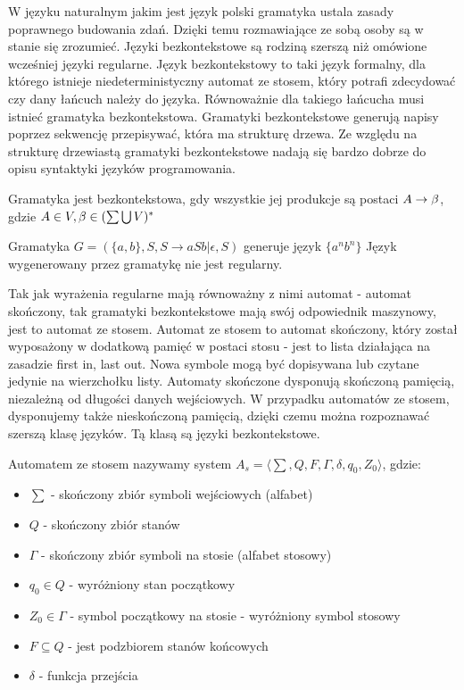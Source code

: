 W języku naturalnym jakim jest język polski gramatyka ustala zasady poprawnego budowania zdań. Dzięki temu rozmawiające ze sobą osoby są w stanie się zrozumieć. Języki bezkontekstowe są rodziną szerszą niż omówione wcześniej języki regularne. Język bezkontekstowy to taki język formalny, dla którego istnieje niedeterministyczny automat ze stosem, który potrafi zdecydować czy dany łańcuch należy do języka. Równoważnie dla takiego łańcucha musi istnieć gramatyka bezkontekstowa. Gramatyki bezkontekstowe generują napisy poprzez sekwencję przepisywać, która ma strukturę drzewa. Ze względu na strukturę drzewiastą gramatyki bezkontekstowe nadają się bardzo dobrze do opisu syntaktyki języków programowania.

\begin{definicja}
Gramatyka jest bezkontekstowa, gdy wszystkie jej produkcje są postaci $\mathnormal{A \rightarrow \beta}$, gdzie $\mathnormal{A \in V, \beta \in (\sum \bigcup V)^{*}}$
\end{definicja}

\begin{przyklad}
	Gramatyka $G = (\{a,b  \}, {S}, {S \rightarrow aSb | \epsilon }, S) $ generuje język $ \{a^{n}b^{n}\}$ Język wygenerowany przez gramatykę nie jest regularny.
\end{przyklad}

Tak jak wyrażenia regularne mają równoważny z nimi automat - automat skończony, tak gramatyki bezkontekstowe mają swój odpowiednik maszynowy, jest to automat ze stosem. Automat ze stosem to automat skończony, który został wyposażony w dodatkową pamięć w postaci stosu - jest to lista działająca na zasadzie first in, last out. Nowa symbole mogą być dopisywana lub czytane jedynie na wierzchołku listy. Automaty skończone dysponują skończoną pamięcią, niezależną od długości danych wejściowych. W przypadku automatów ze stosem, dysponujemy także nieskończoną pamięcią, dzięki czemu można rozpoznawać szerszą klasę języków. Tą klasą są języki bezkontekstowe.

\begin{definicja}
	Automatem ze stosem nazywamy system $A_{s} = \langle \sum, Q, F, \Gamma, \delta, q_{0}, Z_{0} \rangle $, gdzie:
	\begin{itemize}
		\item $\sum$ - skończony zbiór symboli wejściowych (alfabet)
		\item $Q$ - skończony zbiór stanów
		\item $\Gamma$ - skończony zbiór symboli na stosie (alfabet stosowy)
		\item $q_{0} \in Q$ - wyróżniony stan początkowy
		\item $Z_{0} \in \Gamma$ - symbol początkowy na stosie - wyróżniony symbol stosowy
		\item $F \subseteq Q$ - jest podzbiorem stanów końcowych
		\item $\delta$ - funkcja przejścia
	\end{itemize}
\end{definicja} 

